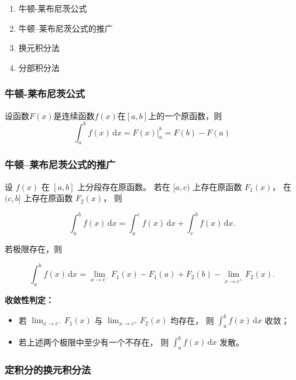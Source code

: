 \documentclass[../book.tex]{subfiles}
\begin{document}
    \begin{enumerate}
        \item 牛顿-莱布尼茨公式
        \item 牛顿–莱布尼茨公式的推广
        \item 换元积分法
        \item 分部积分法
    \end{enumerate}

    \subsubsection{牛顿-莱布尼茨公式}
    设函数$F(x)$是连续函数$f(x)$在$[a, b]$上的一个原函数，则
    \[
        \int_a^b f(x)\,\mathrm{d}x = F(x)\Big|_{a}^{b} = F(b) - F(a)
    \]

    \subsubsection{牛顿–莱布尼茨公式的推广}

    设 $f(x)$ 在 $[a,b]$ 上分段存在原函数。
    若在 $[a,c)$ 上存在原函数 $F_1(x)$，
    在 $(c,b]$ 上存在原函数 $F_2(x)$，
    则

    \[
        \int_a^b f(x)\,\mathrm{d}x
        =
        \int_a^c f(x)\,\mathrm{d}x
        +
        \int_c^b f(x)\,\mathrm{d}x.
    \]

    若极限存在，则

    \[
        \int_a^b f(x)\,\mathrm{d}x
        =
        \lim_{x \to c^-} F_1(x) - F_1(a)
        +
        F_2(b) - \lim_{x \to c^+} F_2(x).
    \]

    \medskip

    \textbf{收敛性判定：}

    \begin{itemize}
        \item 若 $\displaystyle \lim_{x \to c^-} F_1(x)$ 与
        $\displaystyle \lim_{x \to c^+} F_2(x)$ 均存在，
        则 $\displaystyle \int_a^b f(x)\,\mathrm{d}x$ 收敛；

        \item 若上述两个极限中至少有一个不存在，
        则 $\displaystyle \int_a^b f(x)\,\mathrm{d}x$ 发散。
    \end{itemize}

    \subsubsection{定积分的换元积分法}
\end{document}

